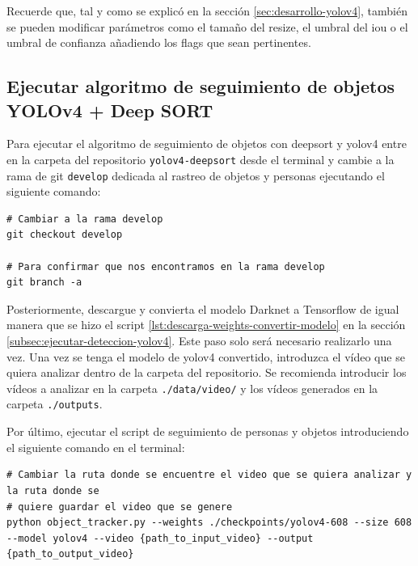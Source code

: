 Recuerde que, tal y como se explicó en la sección \ref{sec:desarrollo-yolov4}, también se pueden modificar parámetros como el tamaño del resize, el umbral del \gls{iou} o el umbral de confianza añadiendo los flags que sean pertinentes.

\subsection{Ejecutar algoritmo de seguimiento de objetos YOLOv4 + Deep SORT}
\label{subsec:ejecutar-seguimiento-yolov4-deepsort}

Para ejecutar el algoritmo de seguimiento de objetos con \gls{deepsort} y \gls{yolov4} entre en la carpeta del repositorio \texttt{yolov4-deepsort} desde el terminal y cambie a la rama de git \texttt{develop} dedicada al rastreo de objetos y personas ejecutando el siguiente comando:

\vspace{0.5cm}
\begin{lstlisting}[language=iPython,caption=cambiar a la rama develop,captionpos=b,label={lst:git-checkout-develop}]
# Cambiar a la rama develop 
git checkout develop

# Para confirmar que nos encontramos en la rama develop
git branch -a
\end{lstlisting}

Posteriormente, descargue y convierta el modelo Darknet a Tensorflow de igual manera que se hizo el script \ref{lst:descarga-weights-convertir-modelo} en la sección \ref{subsec:ejecutar-deteccion-yolov4}. Este paso solo será necesario realizarlo una vez. Una vez se tenga el modelo de \gls{yolov4} convertido, introduzca el vídeo que se quiera analizar dentro de la carpeta del repositorio. Se recomienda introducir los vídeos a analizar en la carpeta \texttt{./data/video/} y los vídeos generados en la carpeta \texttt{./outputs}.

Por último, ejecutar el script de seguimiento de personas y objetos introduciendo el siguiente comando en el terminal:

\vspace{0.5cm}
\begin{lstlisting}[language=iPython,caption=Ejecutar script seguimiento de personas y objetos con DeepSORT,captionpos=b,label={lst:ejecutar-yolov4-deepsort}]
# Cambiar la ruta donde se encuentre el video que se quiera analizar y la ruta donde se
# quiere guardar el video que se genere
python object_tracker.py --weights ./checkpoints/yolov4-608 --size 608 --model yolov4 --video {path_to_input_video} --output {path_to_output_video}
\end{lstlisting}

